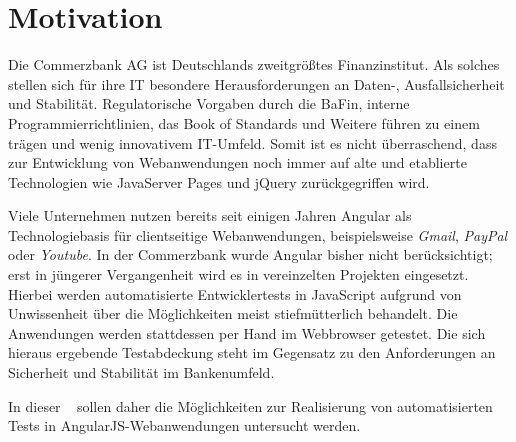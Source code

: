\section{Motivation}\label{einleitung}
Die Commerzbank AG ist Deutschlands zweitgrößtes Finanzinstitut\cite[][2]{handelsblatt:commerzbank}. Als solches stellen sich für ihre IT besondere Herausforderungen an Daten-, Ausfallsicherheit und Stabilität. Regulatorische Vorgaben durch die BaFin\cite{bafin-banken}, interne Programmierrichtlinien\cite{coba-programmierrichtlinienAllgemein, coba-programmierrichtlinienJavaScript}, das Book of Standards \cite{coba-bookOfStandards} und Weitere führen zu einem trägen und wenig innovativem IT-Umfeld. Somit ist es nicht überraschend, dass zur Entwicklung von Webanwendungen noch immer auf alte und etablierte Technologien wie JavaServer Pages und jQuery zurückgegriffen wird.

Viele Unternehmen nutzen bereits seit einigen Jahren Angular als Technologiebasis für clientseitige Webanwendungen, beispielsweise \textit{Gmail}, \textit{PayPal} oder \textit{Youtube}. In der Commerzbank wurde Angular bisher nicht berücksichtigt; erst in jüngerer Vergangenheit wird es in vereinzelten Projekten eingesetzt. Hierbei werden automatisierte Entwicklertests in JavaScript aufgrund von Unwissenheit über die Möglichkeiten meist stiefmütterlich behandelt. Die Anwendungen werden stattdessen per Hand im Webbrowser getestet. Die sich hieraus ergebende Testabdeckung steht im Gegensatz zu den Anforderungen an Sicherheit und Stabilität im Bankenumfeld.

In dieser \titleDocument~ sollen daher die Möglichkeiten zur Realisierung von automatisierten Tests in AngularJS-Webanwendungen untersucht werden. 